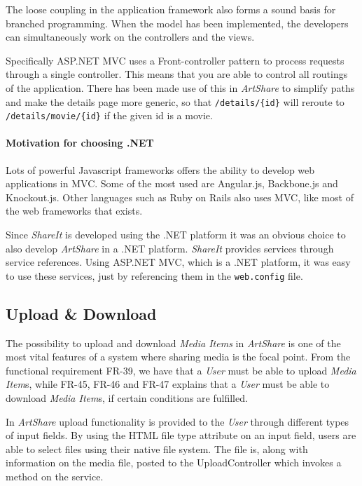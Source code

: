\documentclass[../report.tex]{subfiles}
\begin{document}
The loose coupling in the application framework also forms a sound basis for branched programming. When the model has been implemented, the developers can simultaneously work on the controllers and the views.

Specifically ASP.NET MVC uses a Front-controller pattern to process requests through a single controller. This means that you are able to control all routings of the application. There has been made use of this in \textit{ArtShare} to simplify paths and make the details page more generic, so that \texttt{/details/\{id\}} will reroute to \texttt{/details/movie/\{id\}} if the given id is a movie.

\paragraph{Motivation for choosing .NET}
Lots of powerful Javascript frameworks offers the ability to develop web applications in MVC. Some of the most used are Angular.js, Backbone.js and Knockout.js. Other languages such as Ruby on Rails also uses MVC, like most of the web frameworks that exists.

Since \textit{ShareIt} is developed using the .NET platform it was an obvious choice to also develop \textit{ArtShare} in a .NET platform. \textit{ShareIt} provides services through service references. Using ASP.NET MVC, which is a .NET platform, it was easy to use these services, just by referencing them in the \texttt{web.config} file. 

\subsection{Upload \& Download}

The possibility to upload and download \textit{Media Items} in \textit{ArtShare} is one of the most vital features of a system where sharing media is the focal point. From the functional requirement FR-39, we have that a \textit{User} must be able to upload \textit{Media Item}s, while FR-45, FR-46 and FR-47 explains that a \textit{User} must be able to download \textit{Media Item}s, if certain conditions are fulfilled.

In \textit{ArtShare} upload functionality is provided to the \textit{User} through different types of input fields. By using the HTML file type attribute\cite{w3schools2014} on an input field, users are able to select files using their native file system. The file is, along with information on the media file, posted to the UploadController which invokes a method on the service.
\end{document}
